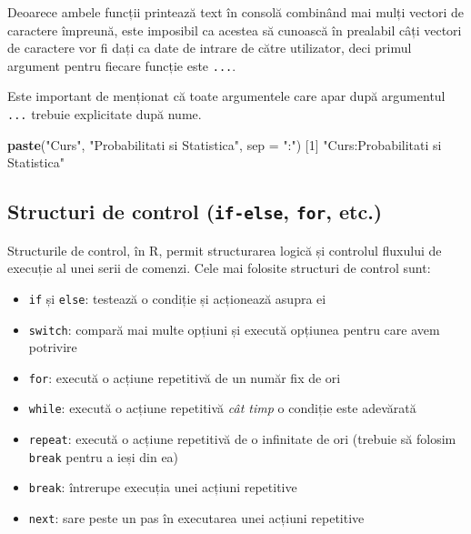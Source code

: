 \documentclass[]{article}
\newenvironment{Shaded}{\begin{snugshade}}{\end{snugshade}}
\newcommand{\DataTypeTok}[1]{\textcolor[rgb]{0.13,0.29,0.53}{#1}}
\newcommand{\DecValTok}[1]{\textcolor[rgb]{0.00,0.00,0.81}{#1}}
\newcommand{\KeywordTok}[1]{\textcolor[rgb]{0.13,0.29,0.53}{\textbf{#1}}}
\newcommand{\NormalTok}[1]{#1}
\newcommand{\StringTok}[1]{\textcolor[rgb]{0.31,0.60,0.02}{#1}}
\newcounter{exo}[section]
\begin{document}
Deoarece ambele funcții printează text în consolă combinând mai mulți
vectori de caractere împreună, este imposibil ca acestea să cunoască în
prealabil câți vectori de caractere vor fi dați ca date de intrare de
către utilizator, deci primul argument pentru fiecare funcție este
\texttt{...}.

Este important de menționat că toate argumentele care apar după
argumentul \texttt{...} trebuie explicitate după nume.

\begin{Shaded}
\begin{Highlighting}[]
\KeywordTok{paste}\NormalTok{(}\StringTok{"Curs"}\NormalTok{, }\StringTok{"Probabilitati si Statistica"}\NormalTok{, }\DataTypeTok{sep =} \StringTok{":"}\NormalTok{)}
\NormalTok{[}\DecValTok{1}\NormalTok{] }\StringTok{"Curs:Probabilitati si Statistica"}
\end{Highlighting}
\end{Shaded}

\hypertarget{structuri-de-control-if-else-for-etc.}{%
\subsection{\texorpdfstring{Structuri de control (\texttt{if-else},
\texttt{for},
etc.)}{Structuri de control (if-else, for, etc.)}}\label{structuri-de-control-if-else-for-etc.}}

Structurile de control, în R, permit structurarea logică și controlul
fluxului de execuție al unei serii de comenzi. Cele mai folosite
structuri de control sunt:

\begin{itemize}
\item
  \texttt{if} și \texttt{else}: testează o condiție și acționează asupra
  ei
\item
  \texttt{switch}: compară mai multe opțiuni și execută opțiunea pentru
  care avem potrivire
\item
  \texttt{for}: execută o acțiune repetitivă de un număr fix de ori
\item
  \texttt{while}: execută o acțiune repetitivă \emph{cât timp} o
  condiție este adevărată
\item
  \texttt{repeat}: execută o acțiune repetitivă de o infinitate de ori
  (trebuie să folosim \texttt{break} pentru a ieși din ea)
\item
  \texttt{break}: întrerupe execuția unei acțiuni repetitive
\item
  \texttt{next}: sare peste un pas în executarea unei acțiuni repetitive
\end{itemize}
\end{document}
